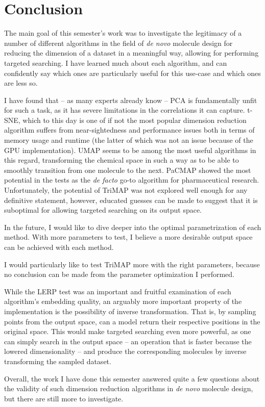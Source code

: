 \chapter{Conclusion}\label{ch:conclusion}


The main goal of this semester's work was to investigate the legitimacy of a number of different algorithms in the field of \textit{de novo} molecule design for reducing the dimension of a dataset in a meaningful way, allowing for performing targeted searching. I have learned much about each algorithm, and can confidently say which ones are particularly useful for this use-case and which ones are less so.

I have found that -- as many experts already know -- PCA is fundamentally unfit for such a task, as it has severe limitations in the correlations it can capture. t-SNE, which to this day is one of if not the most popular dimension reduction algorithm suffers from near-sightedness and performance issues both in terms of memory usage and runtime (the latter of which was not an issue because of the GPU implementation). UMAP seems to be among the most useful algorithms in this regard, transforming the chemical space in such a way as to be able to smoothly transition from one molecule to the next. PaCMAP showed the most potential in the tests as the \textit{de facto}  go-to algorithm for pharmaceutical research. Unfortunately, the potential of TriMAP was not explored well enough for any definitive statement, however, educated guesses can be made to suggest that it is suboptimal for allowing targeted searching on its output space.

In the future, I would like to dive deeper into the optimal parametrization of each method. With more parameters to test, I believe a more desirable output space can be achieved with each method.

I would particularly like to test TriMAP more with the right parameters, because no conclusion can be made from the parameter optimization I performed.

While the LERP test was an important and fruitful examination of each algorithm's embedding quality, an arguably more important property of the implementation is the possibility of inverse transformation. That is, by sampling points from the output space, can a model return their respective positions in the original space. This would make targeted searching even more powerful, as one can simply search in the output space -- an operation that is faster because the lowered dimensionality -- and produce the corresponding molecules by inverse transforming the sampled dataset.

Overall, the work I have done this semester answered quite a few questions about the validity of such dimension reduction algorithms in \textit{de novo} molecule design, but there are still more to investigate.